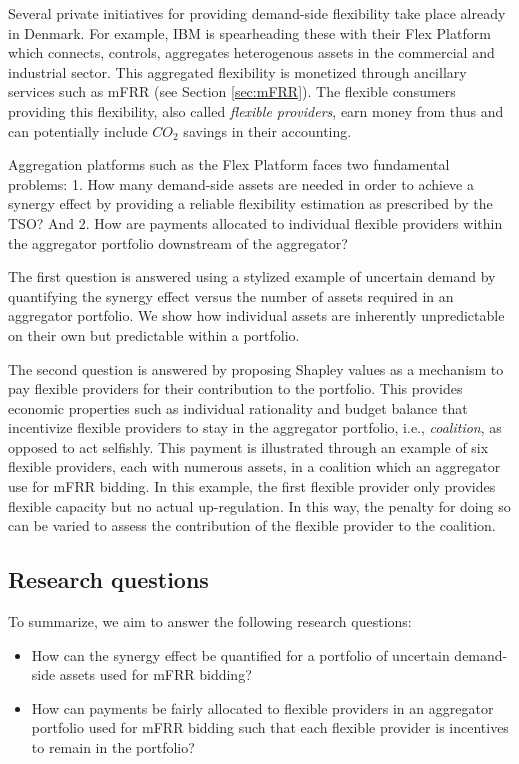 \documentclass[lettersize,journal]{IEEEtran}
\begin{document}
Several private initiatives for providing demand-side flexibility take place already in Denmark. For example, IBM is spearheading these with their Flex Platform which connects, controls, aggregates heterogenous assets in the commercial and industrial sector. This aggregated flexibility is monetized through ancillary services such as mFRR (see Section \ref{sec:mFRR}). The flexible consumers providing this flexibility, also called \textit{flexible providers}, earn money from thus and can potentially include $CO_{2}$ savings in their accounting.

Aggregation platforms such as the Flex Platform faces two fundamental problems: 1. How many demand-side assets are needed in order to achieve a synergy effect by providing a reliable flexibility estimation as prescribed by the TSO? And 2. How are payments allocated to individual flexible providers within the aggregator portfolio downstream of the aggregator?

The first question is answered using a stylized example of uncertain demand by quantifying the synergy effect versus the number of assets required in an aggregator portfolio. We show how individual assets are inherently unpredictable on their own but predictable within a portfolio.

The second question is answered by proposing Shapley values \cite{shapley1997value} as a mechanism to pay flexible providers for their contribution to the portfolio. This provides economic properties such as individual rationality and budget balance that incentivize flexible providers to stay in the aggregator portfolio, i.e., \textit{coalition}, as opposed to act selfishly. This payment is illustrated through an example of six flexible providers, each with numerous assets, in a coalition which an aggregator use for mFRR bidding. In this example, the first flexible provider only provides flexible capacity but no actual up-regulation. In this way, the penalty for doing so can be varied to assess the contribution of the flexible provider to the coalition.

\IEEEpubidadjcol

\subsection{Research questions}

To summarize, we aim to answer the following research questions:

\begin{itemize}
    \item How can the synergy effect be quantified for a portfolio of uncertain demand-side assets used for mFRR bidding?
    \item How can payments be fairly allocated to flexible providers in an aggregator portfolio used for mFRR bidding such that each flexible provider is incentives to remain in the portfolio?
\end{itemize}
\end{document}
